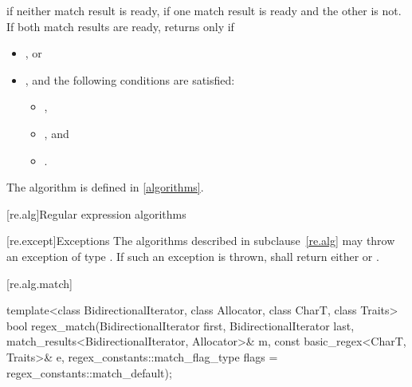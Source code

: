 \begin{itemdescr}
\pnum
\returns
{} if neither match result is ready,  if one match result is ready and the
other is not. If both match results are ready, returns  only if
\begin{itemize}
\item
{}, or

\item
{}, and the following conditions are satisfied:
\begin{itemize}
\item
{},

\item
{}, and

\item
{}.
\end{itemize}
\end{itemize}
\begin{note}
The algorithm  is defined in \ref{algorithms}.
\end{note}
\end{itemdescr}

[re.alg]{Regular expression algorithms}

[re.except]{Exceptions}
\pnum
The algorithms described in subclause~\ref{re.alg} may throw an exception
of type . If such an exception  is thrown,
 shall return either 
or .

[re.alg.match]{}
%
\begin{itemdecl}
template<class BidirectionalIterator, class Allocator, class CharT, class Traits>
  bool regex_match(BidirectionalIterator first, BidirectionalIterator last,
                   match_results<BidirectionalIterator, Allocator>& m,
                   const basic_regex<CharT, Traits>& e,
                   regex_constants::match_flag_type flags = regex_constants::match_default);
\end{itemdecl}

